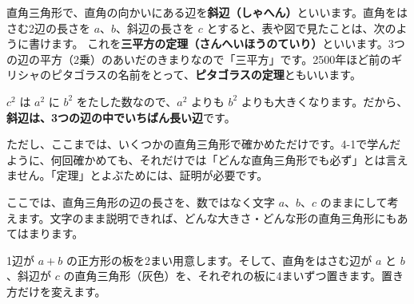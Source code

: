 直角三角形で、直角の向かいにある辺を\textbf{斜辺（しゃへん）}といいます。直角をはさむ2辺の長さを $a$、$b$、斜辺の長さを $c$ とすると、表や図で見たことは、次のように書けます。
これを\textbf{三平方の定理（さんへいほうのていり）}といいます。3つの辺の平方（2乗）のあいだのきまりなので「三平方」です。2500年ほど前のギリシャのピタゴラスの名前をとって、\textbf{ピタゴラスの定理}ともいいます。

$c^2$ は $a^2$ に $b^2$ をたした数なので、$a^2$ よりも $b^2$ よりも大きくなります。だから、\textbf{斜辺は、3つの辺の中でいちばん長い辺}です。

ただし、ここまでは、いくつかの直角三角形で確かめただけです。4-1で学んだように、何回確かめても、それだけでは「どんな直角三角形でも必ず」とは言えません。「定理」とよぶためには、証明が必要です。

\label{bk:4-4:shoumei}ここでは、直角三角形の辺の長さを、数ではなく文字 $a$、$b$、$c$ のままにして考えます。文字のまま説明できれば、どんな大きさ・どんな形の直角三角形にもあてはまります。

1辺が $a+b$ の正方形の板を2まい用意します。そして、直角をはさむ辺が $a$ と $b$、斜辺が $c$ の直角三角形（灰色）を、それぞれの板に4まいずつ置きます。置き方だけを変えます。

